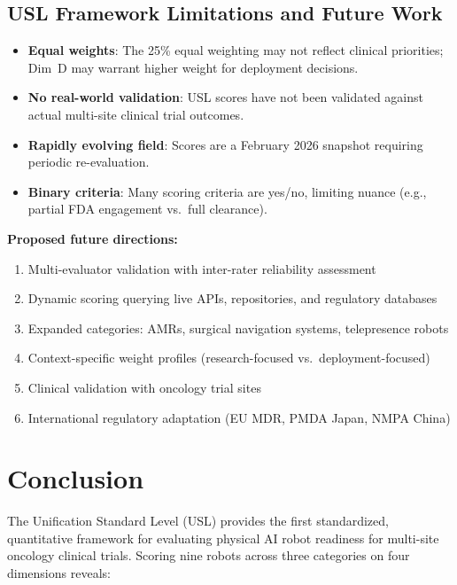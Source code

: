 \subsection{USL Framework Limitations and Future Work}
\begin{itemize}
  \item \textbf{Equal weights}: The 25\% equal weighting may not reflect clinical priorities; Dim~D may warrant higher weight for deployment decisions.
  \item \textbf{No real-world validation}: USL scores have not been validated against actual multi-site clinical trial outcomes.
  \item \textbf{Rapidly evolving field}: Scores are a February 2026 snapshot requiring periodic re-evaluation.
  \item \textbf{Binary criteria}: Many scoring criteria are yes/no, limiting nuance (e.g., partial FDA engagement vs.\ full clearance).
\end{itemize}

\textbf{Proposed future directions:}
\begin{enumerate}
  \item Multi-evaluator validation with inter-rater reliability assessment
  \item Dynamic scoring querying live APIs, repositories, and regulatory databases
  \item Expanded categories: AMRs, surgical navigation systems, telepresence robots
  \item Context-specific weight profiles (research-focused vs.\ deployment-focused)
  \item Clinical validation with oncology trial sites
  \item International regulatory adaptation (EU MDR, PMDA Japan, NMPA China)
\end{enumerate}

\section{Conclusion}
\label{sec:conclusion}

The Unification Standard Level (USL) provides the first standardized, quantitative framework for evaluating physical AI robot readiness for multi-site oncology clinical trials. Scoring nine robots across three categories on four dimensions reveals:

